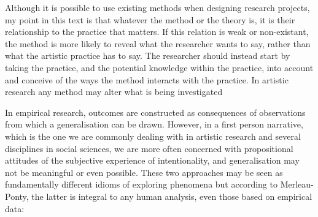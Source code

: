 \documentclass[12pt]{article}
\begin{document}

Although it is possible to use existing methods when designing research projects, my point in this text is that whatever the method or the theory is, it is their relationship to the practice that matters.  If this relation is weak or non-existant, the method is more likely to reveal what the researcher wants to say, rather than what the artistic practice has to say. The researcher should instead start by taking the practice, and the potential knowledge within the practice, into account and conceive of the ways the method interacts with the practice. In artistic research any method may alter what is being investigated 


In empirical research, outcomes are constructed as consequences of observations from which a generalisation can be drawn. However, in a first person narrative, which is the one we are commonly dealing with in artistic research and several disciplines in social sciences, we are more often concerned with propositional attitudes of the subjective experience of intentionality, and generalisation may not be meaningful or even possible. These two approaches may be seen as fundamentally different idioms of exploring phenomena but according to Merleau-Ponty, the latter is integral to any human analysis, even those based on empirical data:
\end{document}
